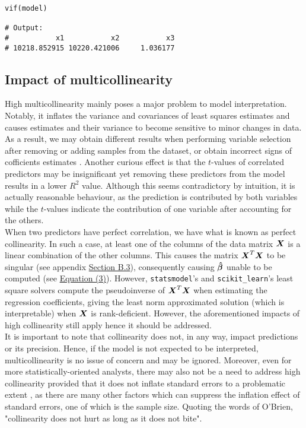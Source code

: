 \documentclass[12pt]{article}
\newcommand{\gbh}{\hat{\gb}}
\begin{document}
\begin{lstlisting}
vif(model)

# Output: 
#           x1           x2           x3 
# 10218.852915 10220.421006     1.036177 
\end{lstlisting}
	
	\subsection{Impact of multicollinearity}
	
	High multicollinearity mainly poses a major problem to model interpretation. Notably, it inflates the variance and covariances of least squares estimates and causes estimates and their variance to become sensitive to minor changes in data. As a result, we may obtain different results when performing variable selection after removing or adding samples from the dataset, or obtain incorrect signs of cofficients estimates \cite{McClave2018}. Another curious effect is that the $t$-values of correlated predictors may be insignificant yet removing these predictors from the model results in a lower $R^2$ value. Although this seems contradictory by intuition, it is actually reasonable behaviour, as the prediction is contributed by both variables while the $t$-values indicate the contribution of one variable after accounting for the others.\\
	
	When two predictors have perfect correlation, we have what is known as perfect collinearity. In such a case, at least one of the columns of the data matrix $\boldsymbol{X}$ is a linear combination of the other columns. This causes the matrix $\boldsymbol{X}^T\boldsymbol{X}$ to be singular (see appendix \hyperref[sec:append1]{Section B.3}), consequently causing $\boldsymbol{\gbh}$ unable to be computed (see \hyperref[eq3]{Equation (3)}). However, \texttt{statsmodel}'s and \texttt{scikit\_learn}'s least square solvers compute the pseudoinverse of $\boldsymbol{X}^T\boldsymbol{X}$ when estimating the regression coefficients, giving the least norm approximated solution (which is interpretable) when $\boldsymbol{X}$ is rank-deficient. However, the aforementioned impacts of high collinearity still apply hence it should be addressed.\\
	
	It is important to note that collinearity does not, in any way, impact predictions or its precision. Hence, if the model is not expected to be interpreted, multicollinearity is no issue of concern and may be ignored. Moreover, even for more statistically-oriented analysts, there may also not be a need to address high collinearity provided that it does not inflate standard errors to a problematic extent \cite{OBrien2007}, as there are many other factors which can suppress the inflation effect of standard errors, one of which is the sample size. Quoting the words of O'Brien, "collinearity does not hurt as long as it does not bite".\cite{OBrien2007}
	
\end{document}
